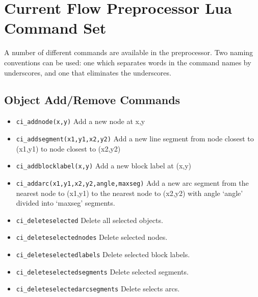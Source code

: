 
\section{Current Flow Preprocessor Lua Command Set}

A number of different commands are available in the preprocessor.
Two naming conventions can be used: one which separates words in
the command names by underscores, and one that eliminates the
underscores.

\subsection{Object Add/Remove Commands}
\begin{itemize}
\item {\tt ci\_addnode(x,y)} Add a new node at x,y

\item {\tt ci\_addsegment(x1,y1,x2,y2)} Add a new line segment from node closest to
(x1,y1) to node closest to (x2,y2)

\item {\tt ci\_addblocklabel(x,y)} Add a new block label at (x,y)

\item {\tt ci\_addarc(x1,y1,x2,y2,angle,maxseg)} Add a new arc segment from the
nearest node to (x1,y1) to the nearest node to (x2,y2) with angle `angle'
divided into `maxseg' segments.

\item {\tt ci\_deleteselected} Delete all selected objects.

\item {\tt ci\_deleteselectednodes} Delete selected nodes.

\item {\tt ci\_deleteselectedlabels} Delete selected block labels.

\item {\tt ci\_deleteselectedsegments} Delete selected segments.

\item {\tt ci\_deleteselectedarcsegments} Delete selects arcs.
\end{itemize}


